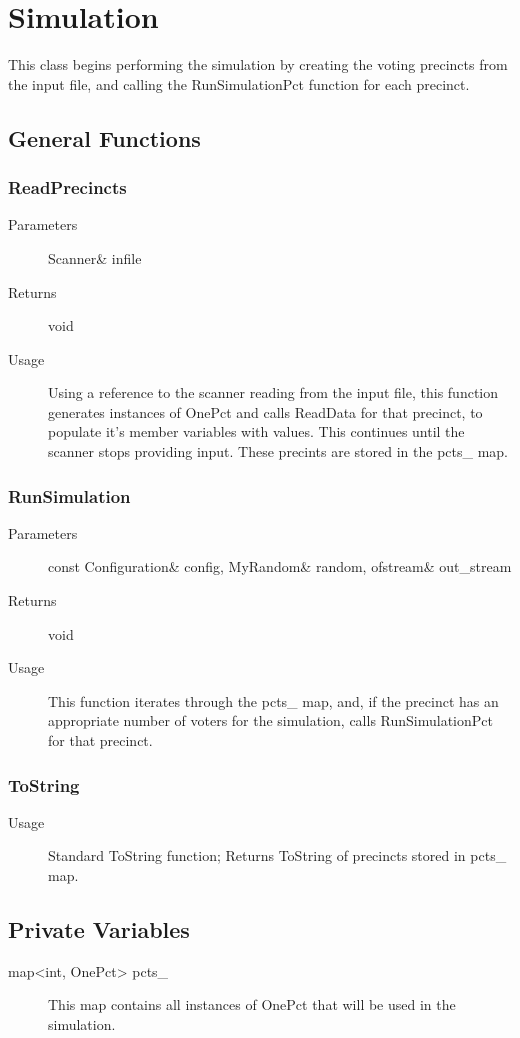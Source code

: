 %

\chapter{Simulation}
This class begins performing the simulation by creating the voting precincts from the input file, and calling the RunSimulationPct function for each precinct.

\section{General Functions}

\subsection{ReadPrecincts}
\begin{description}
\item[Parameters] Scanner\& infile
\item[Returns] void
\item[Usage] Using a reference to the scanner reading from the input file, this function generates instances of OnePct and calls ReadData for that precinct, to populate it's member variables with values.
This continues until the scanner stops providing input.  These precints are stored in the pcts\_ map.
\end{description}

\subsection{RunSimulation}
\begin{description}
\item[Parameters] const Configuration\& config, MyRandom\& random, ofstream\& out\_stream
\item[Returns] void
\item[Usage] This function iterates through the pcts\_ map, and, if the precinct has an appropriate number of voters for the simulation, calls RunSimulationPct for that precinct.
\end{description}

\subsection{ToString}
\begin{description}
\item[Usage] Standard ToString function; Returns ToString of precincts stored in pcts\_ map.
\end{description}

\section{Private Variables}

\begin{description}
\item[map<int, OnePct> pcts\_] This map contains all instances of OnePct that will be used in the simulation.
\end{description}
